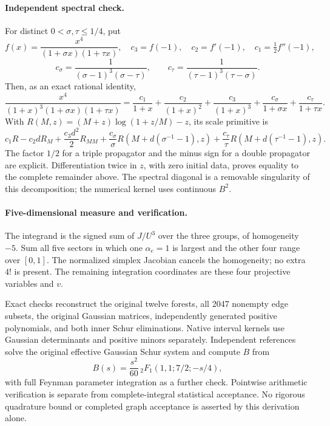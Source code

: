 \documentclass[11pt]{article}
\begin{document}
\paragraph{Independent spectral check.}
For distinct \(0<\sigma,\tau\leq1/4\), put
\[
 f(x)=\frac{x^4}{(1+\sigma x)(1+\tau x)},\quad
 c_3=f(-1),\quad c_2=f'(-1),\quad c_1=\tfrac12f''(-1),
\]
\[
 c_\sigma=\frac1{(\sigma-1)^3(\sigma-\tau)},\qquad
 c_\tau=\frac1{(\tau-1)^3(\tau-\sigma)} .
\]
Then, as an exact rational identity,
\[
 \frac{x^4}{(1+x)^3(1+\sigma x)(1+\tau x)}
 =\frac{c_1}{1+x}+\frac{c_2}{(1+x)^2}
  +\frac{c_3}{(1+x)^3}+\frac{c_\sigma}{1+\sigma x}
  +\frac{c_\tau}{1+\tau x}.
\]
With \(R(M,z)=(M+z)\log(1+z/M)-z\), its scale primitive is
\[
 c_1R-c_2dR_M+\frac{c_3d^2}{2}R_{MM}
 +\frac{c_\sigma}{\sigma}R(M+d(\sigma^{-1}-1),z)
 +\frac{c_\tau}{\tau}R(M+d(\tau^{-1}-1),z).
\]
The factor \(1/2\) for a triple propagator and the minus sign for a double propagator are explicit. Differentiation twice in \(z\), with zero initial data, proves equality to the complete remainder above. The spectral diagonal is a removable singularity of this decomposition; the numerical kernel uses continuous \(B^2\).

\paragraph{Five-dimensional measure and verification.}
The integrand is the signed sum of \(J/U^3\) over the three groups, of homogeneity \(-5\). Sum all five sectors in which one \(\alpha_e=1\) is largest and the other four range over \([0,1]\). The normalized simplex Jacobian cancels the homogeneity; no extra \(4!\) is present. The remaining integration coordinates are these four projective variables and \(v\).

Exact checks reconstruct the original twelve forests, all 2047 nonempty edge subsets, the original Gaussian matrices, independently generated positive polynomials, and both inner Schur eliminations. Native interval kernels use Gaussian determinants and positive minors separately. Independent references solve the original effective Gaussian Schur system and compute \(B\) from
\[
 B(s)=\frac{s^2}{60}\,{}_2F_1(1,1;7/2;-s/4),
\]
with full Feynman parameter integration as a further check. Pointwise arithmetic verification is separate from complete-integral statistical acceptance. No rigorous quadrature bound or completed graph acceptance is asserted by this derivation alone.
\end{document}

